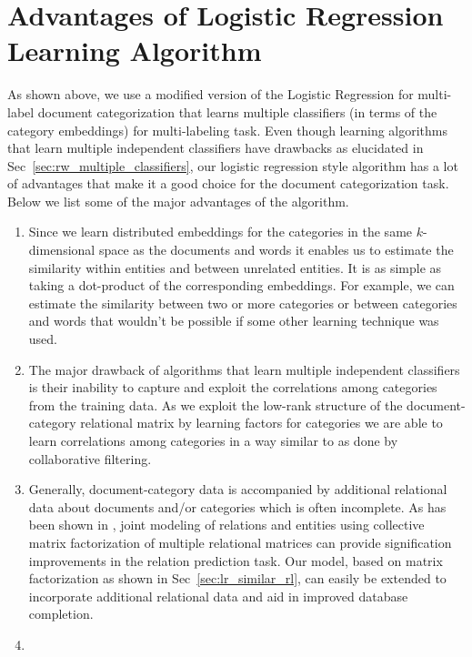 \section{Advantages of Logistic Regression Learning Algorithm}
As shown above, we use a modified version of the Logistic Regression for multi-label document categorization that learns multiple classifiers (in terms of the category embeddings) for multi-labeling task. Even though learning algorithms that learn multiple independent classifiers have drawbacks as elucidated in Sec~\ref{sec:rw_multiple_classifiers}, our logistic regression style algorithm has a lot of advantages that make it a good choice for the document categorization task. Below we list some of the major advantages of the algorithm. 
\begin{enumerate}
\item 
Since we learn distributed embeddings for the categories in the same $k$-dimensional space as the documents and words it enables us to estimate the similarity within entities and between unrelated entities. It is as simple as taking a dot-product of the corresponding embeddings. For example, we can estimate the similarity between two or more categories or between categories and words that wouldn't be possible if some other learning technique was used. 

\item 
The major drawback of algorithms that learn multiple independent classifiers is their inability to capture and exploit the correlations among categories from the training data. As we exploit the low-rank structure of the document-category relational matrix by learning factors for categories we are able to learn correlations among categories in a way similar to as done by collaborative filtering.

\item 
Generally, document-category data is accompanied by additional relational data about documents and/or categories which is often incomplete. As has been shown in \cite{gupta2015collectively}, joint modeling of relations and entities using collective matrix factorization of multiple relational matrices can provide signification improvements in the relation prediction task. 
Our model, based on matrix factorization as shown in Sec~\ref{sec:lr_similar_rl}, can easily be extended to incorporate additional relational data and aid in improved database completion. 

\item {}
\end{enumerate}